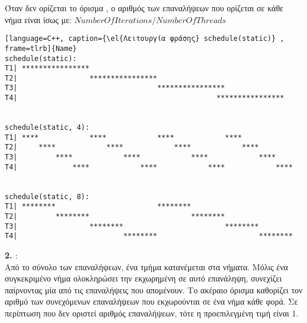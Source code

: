 Όταν δεν ορίζεται το όρισμα \emph{}, ο αριθμός των επαναλήψεων που ορίζεται σε κάθε νήμα είναι ίσως με: $NumberOfIterations / NumberOfThreads$
\begin{spacing}{1.4}
\begin{lstlisting}[language=C++, caption={\el{Λειτουργία φράσης} schedule(static)} , frame=tlrb]{Name}
schedule(static):
T1| ****************                                                
T2|                 ****************                                
T3|                                 ****************                
T4|                                               ****************


schedule(static, 4): 
T1| ****            ****            ****            ****            
T2|     ****            ****            ****            ****        
T3|         ****            ****            ****            ****    
T4|             ****            ****            ****            ****


schedule(static, 8):   
T1| ********                        ********                        
T2|         ********                        ********                
T3|                 ********                        ********        
T4|                         ********                        ********
\end{lstlisting}
\end{spacing}
\clearpage
\textbf{2. \emph{}}: 
\ \\
Από το σύνολο των επαναλήψεων, ένα τμήμα κατανέμεται στα νήματα. Μόλις ένα
συγκεκριμένο νήμα ολοκληρώσει την εκχωρημένη σε αυτό επανάληψη, συνεχίζει παίρνοντας μία από τις επαναλήψεις που απομένουν.
Το ακέραιο όρισμα \emph{} καθορίζει τον αριθμό των συνεχόμενων επαναλήψεων που εκχωρούνται σε ένα νήμα κάθε
φορά. Σε περίπτωση που δεν οριστεί αριθμός επαναλήψεων, τότε η προεπιλεγμένη τιμή είναι 1. \ \\

